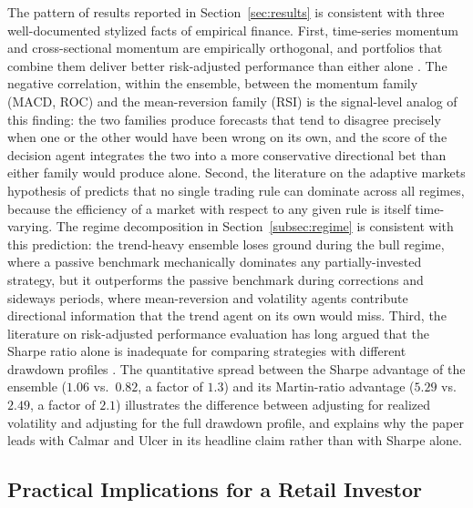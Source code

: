 \documentclass{ieeeaccess}
\newcommand{\Shtest}{\ensuremath{1.06}}
\newcommand{\BHsharpe}{\ensuremath{0.82}}
\newcommand{\EnsMartin}{\ensuremath{5.29}}
\newcommand{\BHMartin}{\ensuremath{2.49}}
\begin{document}
The pattern of results reported in Section~\ref{sec:results} is consistent with three well-documented stylized facts of empirical finance. First, time-series momentum and cross-sectional momentum are empirically orthogonal, and portfolios that combine them deliver better risk-adjusted performance than either alone \cite{jegadeeshtitman1993,moskowitz2012,asness2013}. The negative correlation, within the ensemble, between the momentum family (MACD, ROC) and the mean-reversion family (RSI) is the signal-level analog of this finding: the two families produce forecasts that tend to disagree precisely when one or the other would have been wrong on its own, and the score of the decision agent integrates the two into a more conservative directional bet than either family would produce alone. Second, the literature on the adaptive markets hypothesis of \cite{lo2004} predicts that no single trading rule can dominate across all regimes, because the efficiency of a market with respect to any given rule is itself time-varying. The regime decomposition in Section~\ref{subsec:regime} is consistent with this prediction: the trend-heavy ensemble loses ground during the bull regime, where a passive benchmark mechanically dominates any partially-invested strategy, but it outperforms the passive benchmark during corrections and sideways periods, where mean-reversion and volatility agents contribute directional information that the trend agent on its own would miss. Third, the literature on risk-adjusted performance evaluation has long argued that the Sharpe ratio alone is inadequate for comparing strategies with different drawdown profiles \cite{young1991,sortino1994,martin1989}. The quantitative spread between the Sharpe advantage of the ensemble (\Shtest{} vs.\ \BHsharpe{}, a factor of $1.3$) and its Martin-ratio advantage (\EnsMartin{} vs.\ \BHMartin{}, a factor of $2.1$) illustrates the difference between adjusting for realized volatility and adjusting for the full drawdown profile, and explains why the paper leads with Calmar and Ulcer in its headline claim rather than with Sharpe alone.

\subsection{Practical Implications for a Retail Investor}
\end{document}
